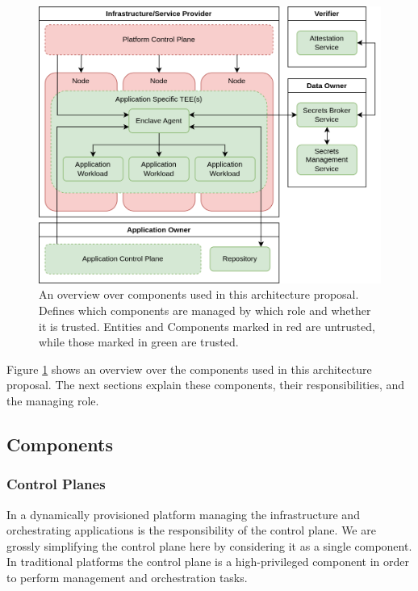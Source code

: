 \begin{figure}
  \centering
  \includegraphics{resources/architecture-overview.png}
  \caption[A simplified overview over the Confidential Containers architecture]{
    An overview over components used in this architecture proposal. Defines
    which components are managed by which role and whether it is trusted.
    Entities and Components marked in red are untrusted, while those marked in
    green are trusted.}
  \label{fig:confidential-containers-overview}
\end{figure}

Figure \ref{fig:confidential-containers-overview} shows an overview over the
components used in this architecture proposal. The next sections explain these
components, their responsibilities, and the managing role.

\subsection{Components}

\subsubsection{Control Planes}

In a dynamically provisioned platform managing the infrastructure and
orchestrating applications is the responsibility of the control plane. We are
grossly simplifying the control plane here by considering it as a single
component. In traditional platforms the control plane is a high-privileged
component in order to perform management and orchestration tasks.

